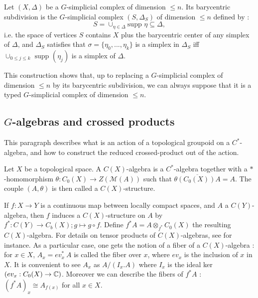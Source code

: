 \begin{definition}
Let $(X,\Delta)$ be a $G$-simplicial complex of dimension $\leq n$. Its barycentric subdivision is the $G$-simplicial complex $(S,\Delta_S)$ of dimension $\leq n$ defined by :
\[S = \cup_{\eta\in \Delta}\text{supp } \eta\subseteq \Delta ,\]
i.e. the space of vertices $S$ contains $X$ plus the barycentric center of any simplex of $\Delta$, and $\Delta_S $ satisfies that $\sigma = \{ \eta_0, ...,\eta_k\}$ is a simplex in $\Delta_S$ iff $\cup_{0 \leq j \leq k}\text{ supp }(\eta_j)$ is a simplex of $\Delta$.
\end{definition}

This construction shows that, up to replacing a $G$-simplicial complex of dimension $\leq n$ by its barycentric subdivision, we can always suppose that it is a typed $G$-simplicial complex of dimension $\leq n$.

\subsection{$G$-algebras and crossed products}

This paragraph describes what is an action of a topological groupoid on a $C^*$-algebra, and how to construct the reduced crossed-product out of the action.

\begin{definition}
Let $X$ be a topological space. A $C(X)$-algebra is a $C^*$-algebra together with a $*$-homomorphism $\theta : C_0(X)\rightarrow Z(\mathcal M(A))$ such that $\overline{\theta (C_0(X)) A} = A$. The couple $(A,\theta)$ is then called a $C(X)$-structure.
\end{definition} 

If $f : X\rightarrow Y$ is a continuous map between locally compact spaces, and $A$ a $C(Y)$-algebra, then $f$ induces a $C(X)$-structure on $A$ by $f^* : C(Y) \rightarrow C_b(X); g\mapsto g\circ f$. Define $f^* A = A \otimes_{f^*} C_0(X)$ the resulting $C(X)$-algebra. For details on tensor products of $C(X)$-algebras, see \cite{LeGall} for instance. As a particular case, one gets the notion of a fiber of a $C(X)$-algebra : for $x\in X$, $A_x = ev_x^* \ A$ is called the fiber over $x$, where $ev_x$ is the inclusion of $x$ in $X$. It is convenient to see $A_x$ as $A/ (I_x .A)$ where $I_x$ is the ideal ker $(ev_x : C_0(X) \rightarrow \mathbb C)$. Moreover we can describe the fibers of $f^*A$ : $(f^*A)_x \cong A_{f(x)}$ for all $x\in X$.\\

